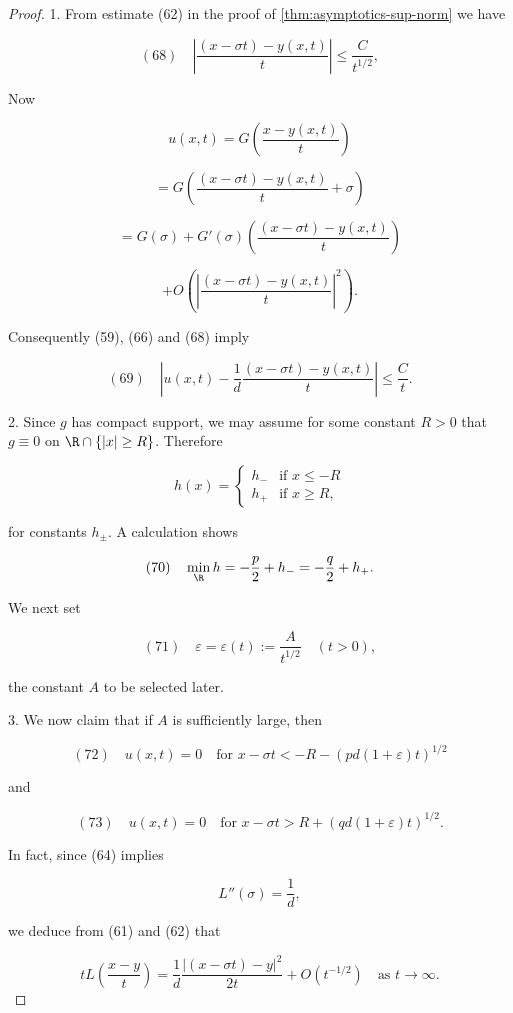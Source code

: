 \begin{proof}
1. From estimate (62) in the proof of \cref{thm:asymptotics-sup-norm} we have

$$(68) \quad \left| \frac{(x - \sigma t) - y(x,t)}{t} \right| \leq \frac{C}{t^{1/2}},$$

Now

$$u(x,t) = G\left(\frac{x - y(x,t)}{t}\right)$$

$$= G\left(\frac{(x - \sigma t) - y(x,t)}{t} + \sigma\right)$$

$$= G(\sigma) + G'(\sigma)\left(\frac{(x - \sigma t) - y(x,t)}{t}\right)$$

$$+ O\left(\left|\frac{(x - \sigma t) - y(x,t)}{t}\right|^2\right).$$

Consequently (59), (66) and (68) imply

$$(69) \quad \left|u(x,t) - \frac{1}{d}\frac{(x-\sigma t) - y(x,t)}{t}\right| \leq \frac{C}{t}.$$

2. Since $g$ has compact support, we may assume for some constant $R > 0$ that $g \equiv 0$ on $\R \cap \{|x| \geq R\}$. Therefore

$$h(x) = \begin{cases}
h_- & \text{if } x \leq -R \\
h_+ & \text{if } x \geq R,
\end{cases}$$

for constants $h_\pm$. A calculation shows

$$(70) \quad \min_\R h = -\frac{p}{2} + h_- = -\frac{q}{2} + h_+.$$

We next set

$$(71) \quad \varepsilon = \varepsilon(t) := \frac{A}{t^{1/2}} \quad (t > 0),$$

the constant $A$ to be selected later.

3. We now claim that if $A$ is sufficiently large, then

$$(72) \quad u(x,t) = 0 \quad \text{for } x - \sigma t < -R - (pd(1+\varepsilon)t)^{1/2}$$

and

$$(73) \quad u(x,t) = 0 \quad \text{for } x - \sigma t > R + (qd(1+\varepsilon)t)^{1/2}.$$

In fact, since (64) implies

$$L''(\sigma) = \frac{1}{d},$$

we deduce from (61) and (62) that

$$tL\left(\frac{x-y}{t}\right) = \frac{1}{d}\frac{|(x-\sigma t) - y|^2}{2t} + O(t^{-1/2}) \quad \text{as } t \to \infty.$$


\end{proof}
